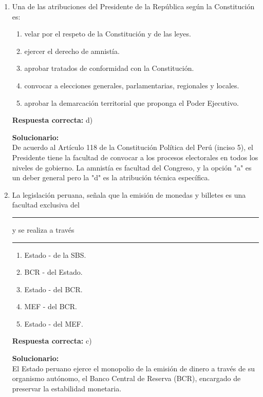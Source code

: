 \begin{enumerate}
	\item Una de las atribuciones del Presidente de la República según la Constitución es:
	\begin{enumerate}[label=\alph*)]
		\item velar por el respeto de la Constitución y de las leyes.
		\item ejercer el derecho de amnistía.
		\item aprobar tratados de conformidad con la Constitución.
		\item convocar a elecciones generales, parlamentarias, regionales y locales.
		\item aprobar la demarcación territorial que proponga el Poder Ejecutivo.
	\end{enumerate}
	\textbf{Respuesta correcta:} d)
	
	\vspace{2mm}
	\textbf{Solucionario:}\\
	De acuerdo al Artículo 118 de la Constitución Política del Perú (inciso 5), el Presidente tiene la facultad de convocar a los procesos electorales en todos los niveles de gobierno. La amnistía es facultad del Congreso, y la opción "a" es un deber general pero la "d" es la atribución técnica específica.
	
	\vspace{6mm}
	
	\item La legislación peruana, señala que la emisión de monedas y billetes es una facultad exclusiva del \rule{1.5cm}{0.4pt} y se realiza a través \rule{1.5cm}{0.4pt}
	\begin{enumerate}[label=\alph*)]
		\item Estado - de la SBS.
		\item BCR - del Estado.
		\item Estado - del BCR.
		\item MEF - del BCR.
		\item Estado - del MEF.
	\end{enumerate}
	\textbf{Respuesta correcta:} c)
	
	\vspace{2mm}
	\textbf{Solucionario:}\\
	El Estado peruano ejerce el monopolio de la emisión de dinero a través de su organismo autónomo, el Banco Central de Reserva (BCR), encargado de preservar la estabilidad monetaria.
	
	\vspace{6mm}
\end{enumerate}

